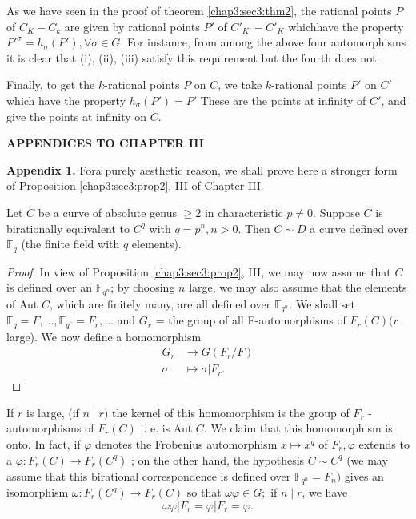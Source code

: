 As we have seen in the proof of theorem \ref{chap3:sec3:thm2}, the rational points $P$
of $C_{K} - C_{k}$ are given by rational points $P'$ of $C'_{K'}-
C'_{K}$ which\pageoriginale have the property $P'^{\sigma} =
h_{\sigma}(P'),\forall\sigma\in G$. For instance, from among the above
four automorphisms it is clear that (i), (ii), (iii) satisfy this
requirement but the fourth does not. 

Finally, to get the $k$-rational points $P$ on $C$, we take
$k$-rational points $P'$ on $C'$ which have the property
$h_{\sigma}(P') = P'$ These are the points at infinity of $C'$, and
give the points at infinity on $C$.   
\newpage 

\thispagestyle{empty}
\begin{center}
  \textbf{\LARGE APPENDICES TO CHAPTER III}
\end{center}



\noindent \textbf{Appendix 1.} For\pageoriginale a purely aesthetic reason, we shall prove
here a stron\-ger form of Proposition \ref{chap3:sec3:prop2}, III of Chapter III. 
  
\begin{prop*} 
  Let $C$ be a curve of absolute genus $\geq 2$
  in characteristic $ p \neq 0$.  Suppose $C$ is birationally
  equivalent to $C^q$ with $q = p^n,  n > 0$. Then $ C \sim D$ a curve
  defined over $\mathbb{F} _q$ (the finite field with $q$ elements). 
\end{prop*}

\begin{proof}%
  In  view of Proposition \ref{chap3:sec3:prop2}, III, we may now assume that $C$ is
  defined over an $\mathbb{F}_{q^n} $; by choosing $n$ large, we may
  also assume that the elements of Aut $C$, which are finitely many,
  are all defined over $\mathbb{F}_{q^n}$. We shall set $\mathbb{F} _q
  = F,\ldots ,\mathbb{F}_{q^r} = F_r{,\ldots}$ and $G_r$ =  the group
  of all F-automorphisms of  $F_r(C) (r$ large). We now define a
  homomorphism  
  \begin{align*}
    G_r & \longrightarrow G(F_r/F)\\
    \sigma & \longmapsto \sigma \vert F_r .
  \end{align*}
\end{proof}

If $r$ is large, (if $n \mid r )$ the kernel of this homomorphism is the
group of $F_r$ -automorphisms of $F_r(C)$  i. e. is Aut $C$. We
claim that this homomorphism is onto. In fact, if $\varphi$ denotes the
Frobenius automorphism $ x \mapsto x^q$ of $F_r, \varphi$ extends to a
$\varphi : F_r (C)\longrightarrow F_r (C^q)$ ; on the other hand, the
hypothesis $C \sim C^q$ (we may assume that this birational
correspondence is defined over $\mathbb{F}_{q^n} = F_n )$ gives an
isomorphism $\omega: F_r (C^q)\to F_r(C)$ so that $\omega \varphi \in
G ;$ if $n \mid r $, we have 
$$
\omega \varphi \vert F_r = \varphi  \vert F_r = \varphi.
$$

